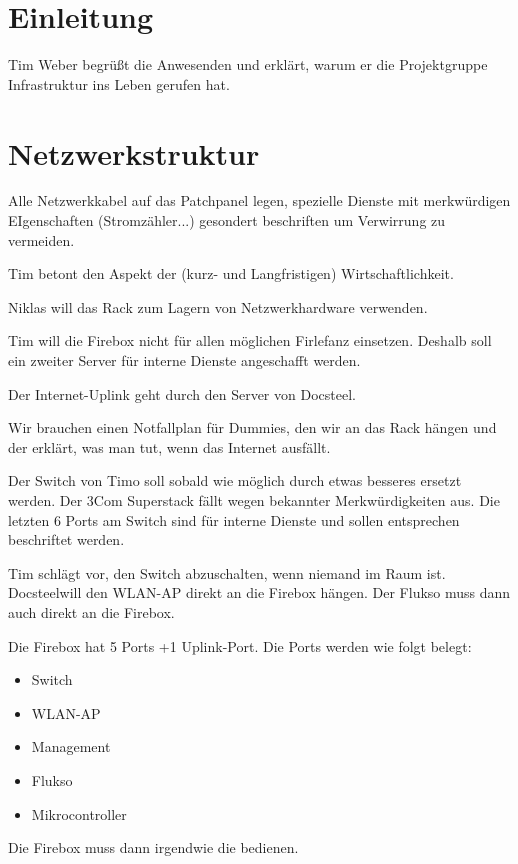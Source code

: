 \documentclass{scrartcl}
\newcommand\docsteel{Docsteel}
\begin{document}
\tableofcontents

\section{Einleitung}

Tim Weber begrüßt die Anwesenden und erklärt, warum er die Projektgruppe Infrastruktur ins Leben gerufen hat.

\section{Netzwerkstruktur}

Alle Netzwerkkabel auf das Patchpanel legen, spezielle Dienste mit merkwürdigen EIgenschaften (Stromzähler...) gesondert beschriften
um Verwirrung zu vermeiden.

Tim betont den Aspekt der (kurz- und Langfristigen) Wirtschaftlichkeit.

Niklas will das Rack zum Lagern von Netzwerkhardware verwenden.

Tim will die Firebox nicht für allen möglichen Firlefanz einsetzen.
Deshalb soll ein zweiter Server für interne Dienste angeschafft werden.

Der Internet-Uplink geht durch den Server von \docsteel.

Wir brauchen einen Notfallplan für Dummies, den wir an das Rack hängen und der erklärt, was man tut, wenn
das Internet ausfällt.

Der Switch von Timo soll sobald wie möglich durch etwas besseres ersetzt werden.
Der 3Com Superstack fällt wegen bekannter Merkwürdigkeiten aus.
Die letzten 6 Ports am Switch sind für interne Dienste und sollen entsprechen beschriftet werden.

Tim schlägt vor, den Switch abzuschalten, wenn niemand im Raum ist.
\docsteel will den WLAN-AP direkt an die Firebox hängen.
Der Flukso muss dann auch direkt an die Firebox.

Die Firebox hat 5 Ports +1 Uplink-Port. Die Ports werden wie folgt belegt:
\begin{itemize}
\item{} Switch
\item{} WLAN-AP
\item{} Management
\item{} Flukso
\item{} Mikrocontroller
\end{itemize}

Die Firebox muss dann irgendwie die \steckdosen bedienen.
\end{document}
